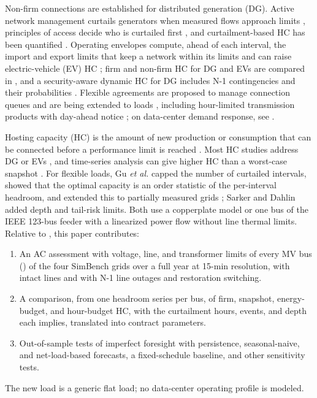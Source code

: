 \documentclass[conference,letterpaper]{IEEEtran}
\begin{document}
Non-firm connections are established for distributed generation (DG). Active network management curtails generators when measured flows approach limits \cite{currie2007}, principles of access decide who is curtailed first \cite{kane2014}, and curtailment-based HC has been quantified \cite{anaya2015,kulmala2017}. Operating envelopes compute, ahead of each interval, the import and export limits that keep a network within its limits \cite{petrou2021,liu2022} and can raise electric-vehicle (EV) HC \cite{fani2024}; firm and non-firm HC for DG and EVs are compared in \cite{zakaria2025}, and a security-aware dynamic HC for DG includes N-1 contingencies and their probabilities \cite{herding2024}. Flexible agreements are proposed to manage connection queues \cite{desanti2025} and are being extended to loads \cite{doe2024}, including hour-limited transmission products with day-ahead notice \cite{tennet_tdtr}; on data-center demand response, see \cite{wierman2014,colangelo2025}.

Hosting capacity (HC) is the amount of new production or consumption that can be connected before a performance limit is reached \cite{bollen2017}. Most HC studies address DG \cite{ismael2019,benzerga2025,mulenga2020} or EVs \cite{umoh2023}, and time-series analysis can give higher HC than a worst-case snapshot \cite{jain2019}. For flexible loads, Gu \emph{et al.} \cite{gu2026hicss} capped the number of curtailed intervals, showed that the optimal capacity is an order statistic of the per-interval headroom, and extended this to partially measured grids \cite{gu2026eenergy}; Sarker and Dahlin \cite{sarker2026} added depth and tail-risk limits. Both use a copperplate model or one bus of the IEEE 123-bus feeder with a linearized power flow without line thermal limits. Relative to \cite{gu2026hicss,sarker2026}, this paper contributes:
\begin{enumerate}
\item An AC assessment with voltage, line, and transformer limits of every MV bus (\nBus) of the four SimBench grids \cite{simbench} over a full year at 15-min resolution, with intact lines and with N-1 line outages and restoration switching.
\item A comparison, from one headroom series per bus, of firm, snapshot, energy-budget, and hour-budget HC, with the curtailment hours, events, and depth each implies, translated into contract parameters.
\item Out-of-sample tests of imperfect foresight with persistence, seasonal-naive, and net-load-based forecasts, a fixed-schedule baseline, and other sensitivity tests.
\end{enumerate}
The new load is a generic flat load; no data-center operating profile is modeled.
\end{document}
